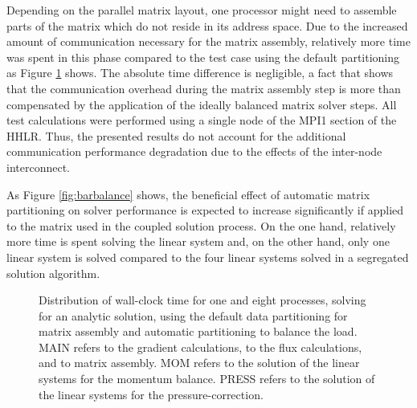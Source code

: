 Depending on the parallel matrix layout, one processor might need to assemble parts of the matrix which do not reside in its address space. Due to the increased amount of communication necessary for the matrix assembly, relatively more time was spent in this phase compared to the test case using the default partitioning as Figure \ref{fig:distseg} shows. The absolute time difference is negligible, a fact that shows that the communication overhead during the matrix assembly step is more than compensated by the application of the ideally balanced matrix solver steps. All test calculations were performed using a single node of the MPI1 section of the HHLR. Thus, the presented results do not account for the additional communication performance degradation due to the effects of the inter-node interconnect.

As Figure \ref{fig:barbalance} shows, the beneficial effect of automatic matrix partitioning on solver performance is expected to increase significantly if applied to the matrix used in the coupled solution process. On the one hand, relatively more time is spent solving the linear system and, on the other hand, only one linear system is solved compared to the four linear systems solved in a segregated solution algorithm.

\begin{figure}[h!]
\hfil
\caption{Distribution of wall-clock time for one and eight processes, solving for an analytic solution, using the default data partitioning for matrix assembly and automatic partitioning to balance the load. MAIN refers to the gradient calculations, to the flux calculations, and to matrix assembly. MOM refers to the solution of the linear systems for the momentum balance. PRESS refers to the solution of the linear systems for the pressure-correction.}
\label{fig:distseg}
\end{figure}

